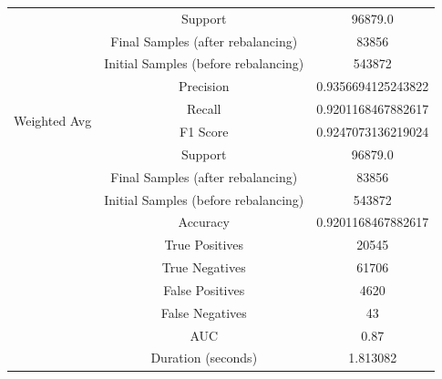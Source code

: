 \begin{longtable}{|c|c|c|}
 & Support & 96879.0 \\
 & Final Samples (after rebalancing) & 83856 \\
 & Initial Samples (before rebalancing) & 543872 \\
\hline
\multirow{4}{*}{Weighted Avg} & Precision & 0.9356694125243822 \\
 & Recall & 0.9201168467882617 \\
 & F1 Score & 0.9247073136219024 \\
 & Support & 96879.0 \\
 & Final Samples (after rebalancing) & 83856 \\
 & Initial Samples (before rebalancing) & 543872 \\
\hline
& Accuracy & 0.9201168467882617 \\ \hline
& True Positives & 20545 \\ \hline
& True Negatives & 61706 \\ \hline
& False Positives & 4620 \\ \hline
& False Negatives & 43 \\ \hline
& AUC & 0.87 \\ \hline
& Duration (seconds) & 1.813082 \\ \hline
\end{longtable}


